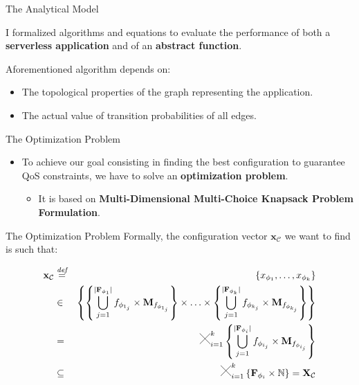\documentclass[13.5pt]{beamer}
\newcommand{\B}[1]{\textcolor{TorVergataColor}{\textbf{#1}}}
\newcommand{\Cross}{\mathbin{\tikz [x=2.5ex,y=2.5ex,line width=.10ex] \draw (0,0) -- (1,1) (0,1) -- (1,0);}}
\newcommand{\mathDef}{\overset{\textit{def}}{=}}
\begin{document}
\begin{frame}{The Analytical Model}
	

\begin{block}{}
	I formalized algorithms and equations to evaluate the performance of both a \B{serverless application} and of an \B{abstract function}.
\end{block}
\vspace{\baselineskip}

Aforementioned algorithm depends on:
\begin{itemize}
	\item The topological properties of the graph representing the application.
	\item The actual value of transition probabilities of all edges.
\end{itemize}

\end{frame}
\begin{frame}{The Optimization Problem}

\begin{itemize}
	\item To achieve our goal consisting in finding the best configuration to guarantee QoS constraints, we have to solve an \B{optimization problem}.
	\begin{itemize}
		\item It is based on \B{Multi-Dimensional Multi-Choice Knapsack Problem Formulation}. 
	\end{itemize}
\end{itemize}

\end{frame}


\begin{frame}{The Optimization Problem}
	Formally, the configuration vector $\textbf{x}_{\mathcal{C}}$ we want to find is such that:
	
	\begin{eqnarray}
		\textbf{x}_{\mathcal{C}} & \mathDef & \left\lbrace x_{\phi_{1}}, \ldots, x_{\phi_{k}} \right\rbrace \nonumber \\ 
		& \in & \left\{  \left\{ \bigcup_{j=1}^{|\textbf{F}_{\phi_{1}}|} f_{\phi_{1_j}} \times \textbf{M}_{f_{\phi_{1_j}}} \right\} \times \ldots \times \left\{ \bigcup_{j=1}^{|\textbf{F}_{\phi_{k}}|} f_{\phi_{k_j}} \times \textbf{M}_{f_{\phi_{k_j}}} \right\} \right\}  \nonumber \\
		& = & \Cross_{i = 1}^k \left\{ \bigcup_{j=1}^{|\textbf{F}_{\phi_{i}}|} f_{\phi_{i_j}} \times \textbf{M}_{f_{\phi_{i_j}}} \right\} \nonumber \\
		& \subseteq & \Cross_{i = 1}^k \left\{ \textbf{F}_{\phi_{i}} \times \mathbb{N} \right\} = \textbf{X}_{\mathcal{C}}
	\end{eqnarray}

\end{frame}
\end{document}
